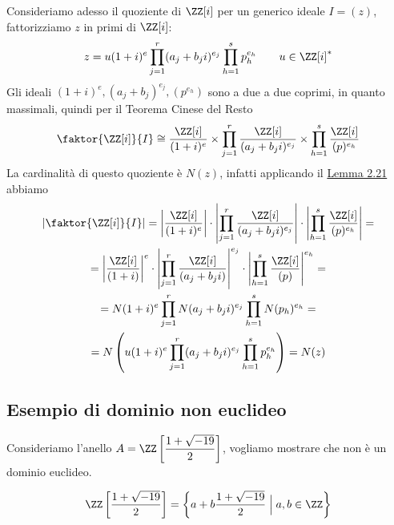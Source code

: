 \documentclass[11pt]{scrartcl}
\begin{document}
Consideriamo adesso il quoziente di $\ZZ[i]$ per un generico ideale $I = (z)$,
fattorizziamo $z$ in primi di $\ZZ[i]$:
\[
    z = u(1 + i)^e\prod_{j = 1}^r (a_j + b_j i)^{e_j}\prod_{h = 1}^s p_h^{e_h}
    \qquad u \in \ZZ[i]^*
\]
Gli ideali $(1 + i)^e, (a_j + b_j)^{e_j}, (p^{e_h})$ sono a due a due coprimi,
in quanto massimali, quindi per il Teorema Cinese del Resto
\[
    \faktor{\ZZ[i]}{I} \cong \frac{\ZZ[i]}{(1 + i)^e}\times
    \prod_{j = 1}^r\frac{\ZZ[i]}{(a_j + b_ji)^{e_j}}
    \times \prod_{h = 1}^s \frac{\ZZ[i]}{(p)^{e_h}}
\]
La cardinalità di questo quoziente è $N(z)$, infatti applicando il 
\hyperref[lemma2.21]{Lemma 2.21} abbiamo
\begin{multline*}
    \left|\faktor{\ZZ[i]}{I}\right| = \left|\frac{\ZZ[i]}{(1 + i)^e}\right|\cdot
    \left|\prod_{j = 1}^r\frac{\ZZ[i]}{(a_j + b_ji)^{e_j}}\right|\cdot
    \left|\prod_{h = 1}^s \frac{\ZZ[i]}{(p)^{e_h}}\right| = \\
    = \left|\frac{\ZZ[i]}{(1 + i)}\right|^e\cdot
    \left|\prod_{j = 1}^r\frac{\ZZ[i]}{(a_j + b_ji)}\right|^{e_j}\cdot
    \left|\prod_{h = 1}^s \frac{\ZZ[i]}{(p)}\right|^{e_h} = \\
    = N(1 + i)^e\prod_{j = 1}^r N(a_j + b_ji)^{e_j}\prod_{h = 1}^s N(p_h)^{e_h} = \\
    = N\left(u(1 + i)^e\prod_{j = 1}^r (a_j + b_j i)^{e_j}\prod_{h = 1}^s p_h^{e_h}\right)
    = N(z)\\
\end{multline*}

\newpage

\subsection{Esempio di dominio non euclideo}

Consideriamo l'anello $\displaystyle A = \ZZ\left[\frac{1 + \sqrt{-19}}{2}\right]$,
vogliamo mostrare che non è un dominio euclideo. 

\begin{proposition}
    \[
        \ZZ\left[\frac{1 + \sqrt{-19}}{2}\right] = 
        \left\{a + b\frac{1 + \sqrt{-19}}{2}\Bigm| a, b \in \ZZ\right\}
    \]
\end{proposition}
\end{document}
